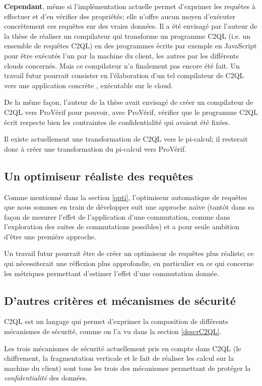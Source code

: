 \textbf{Cependant}, même si l'implémentation
actuelle permet d'exprimer les requêtes à effectuer
et d'en vérifier des propriétés; elle n'offre aucun moyen
d'exécuter concrètement ces requêtes sur des
vraies données.
Il a été envisagé par l'auteur de la thèse
de réaliser un compilateur qui transforme un programme
C2QL (i.e. un ensemble de requêtes C2QL) en
des programmes écrits par exemple en JavaScript
pour être exécutés l'un par la machine du client,
les autres par les différents clouds concernés.
Mais ce compilateur n'a finalement pas encore été fait.
Un travail futur pourrait consister en l'élaboration
d'un tel compilateur de C2QL vers une application
\og concrète \fg{}, exécutable sur le cloud.

De la même façon,
l'auteur de la thèse avait envisagé de
créer un \og compilateur \fg{} de C2QL vers
ProVérif pour pouvoir, avec ProVérif,
vérifier que le programme C2QL écrit respecte bien
les contraintes de confidentialité qui avaient été fixées.

Il existe actuellement une transformation de
C2QL vers le pi-calcul; il resterait donc
à créer une transformation du pi-calcul vers ProVérif.

\subsection*{Un optimiseur réaliste des requêtes}
Comme mentionné dans la section \ref{opti},
l'optimiseur automatique de requêtes
que nous sommes en train de développer 
suit une approche naïve (tantôt dans sa façon de
mesurer l'effet de l'application d'une commutation, 
comme dans l'exploration des suites de commutations
possibles) et a pour seule ambition d'être une
première approche.

Un travail futur pourrait être de créer un optimiseur
de requêtes plus réaliste; ce qui nécessiterait
une réflexion plus approfondie, en particulier
en ce qui concerne les métriques permettant d'estimer
l'effet d'une commutation donnée.

\subsection*{D'autres critères et mécanismes de sécurité}
C2QL est un langage qui permet d'exprimer la composition 
de différents mécanismes de sécurité, comme on l'a vu dans
la section \ref{descrC2QL}.

Les trois mécanismes de sécurité actuellement
pris en compte dans C2QL
(le chiffrement, la fragmentation verticale
et le fait de réaliser les calcul sur
la machine du client)
sont tous les trois des mécanismes permettant
de protéger la \emph{confidentialité} des données.

